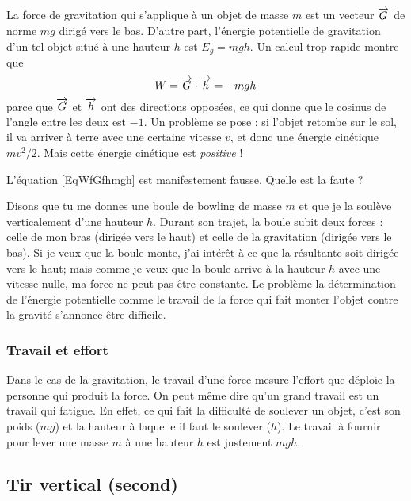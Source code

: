 La force de gravitation qui s'applique à un objet de masse $m$ est un vecteur $\overrightarrow{G}$ de norme $mg$ dirigé vers le bas. D'autre part,  l'énergie potentielle de gravitation d'un tel objet situé à une hauteur $h$ est $E_g=mgh$. Un calcul trop rapide montre que 
\begin{equation}		\label{EqWfGfhmgh}
	W=\overrightarrow{G}\cdot\overrightarrow{h}=-mgh
\end{equation}
parce que $\overrightarrow{G}$ et $\overrightarrow{h}$ ont des directions opposées, ce qui donne que le cosinus de l'angle entre les deux est $-1$. Un problème se pose : si l'objet retombe sur le sol, il va arriver à terre avec une certaine vitesse $v$, et donc une énergie cinétique $mv^2/2$. Mais cette énergie cinétique est \emph{positive} !

\begin{probleme}
	L'équation \eqref{EqWfGfhmgh} est manifestement fausse. Quelle est la faute ?
\end{probleme}

Disons que tu me donnes une boule de bowling de masse $m$ et que je la soulève verticalement d'une hauteur $h$. Durant son trajet, la boule subit deux forces : celle de mon bras (dirigée vers le haut) et celle de la gravitation (dirigée vers le bas). Si je veux que la boule monte, j'ai intérêt à ce que la résultante soit dirigée vers le haut; mais comme je veux que la boule arrive à la hauteur $h$ avec une vitesse nulle, ma force ne peut pas être constante. Le problème la détermination de l'énergie potentielle comme le travail de la force qui fait monter l'objet contre la gravité s'annonce être difficile.

\subsubsection{Travail et effort}

Dans le cas de la gravitation, le travail d'une force mesure l'effort que déploie la personne qui produit la force. On peut même dire qu'un grand travail est un travail qui fatigue. En effet, ce qui fait la difficulté de soulever un objet, c'est son poids ($mg$) et la hauteur à laquelle il faut le soulever ($h$). Le travail à fournir pour lever une masse $m$ à une hauteur $h$ est justement $mgh$.

\subsection{Tir vertical (second)}
\label{SubsecTirVecrtical}

